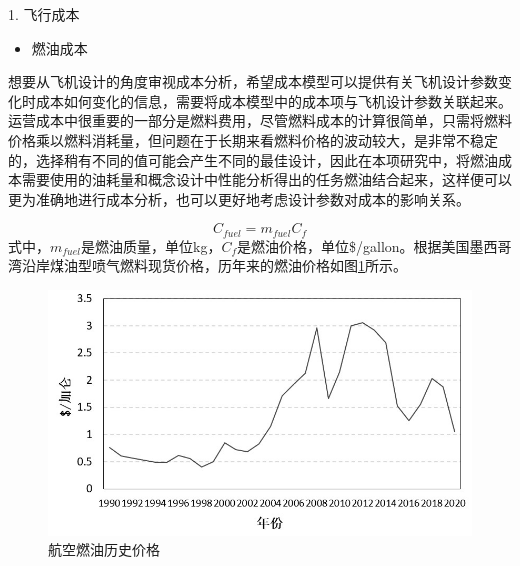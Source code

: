 \documentclass[12pt,a4paper]{report}
\begin{document}
1. 飞行成本
\begin{itemize}
    \item[(1)] 燃油成本
\end{itemize}

想要从飞机设计的角度审视成本分析，希望成本模型可以提供有关飞机设计参数变化时成本如何变化的信息，需要将成本模型中的成本项与飞机设计参数关联起来。运营成本中很重要的一部分是燃料费用，尽管燃料成本的计算很简单，只需将燃料价格乘以燃料消耗量，但问题在于长期来看燃料价格的波动较大，是非常不稳定的，选择稍有不同的值可能会产生不同的最佳设计，因此在本项研究中，将燃油成本需要使用的油耗量和概念设计中性能分析得出的任务燃油结合起来，这样便可以更为准确地进行成本分析，也可以更好地考虑设计参数对成本的影响关系。

\begin{equation}
\label{eq:fuelcost}
C_{fuel}=m_{fuel}C_{f}
\end{equation}
式中，$m_{fuel}$是燃油质量，单位kg，$C_{f}$是燃油价格，单位\$/gallon。根据美国墨西哥湾沿岸煤油型喷气燃料现货价格\cite{fuelprice}，历年来的燃油价格如图\ref{fig:fuelprice}所示。
\begin{figure}[!htp]
  \centering
  \includegraphics[width=.8\textwidth]{eps/fuelprice.jpg}
  \caption{航空燃油历史价格}
 \label{fig:fuelprice}
\end{figure}
\end{document}
